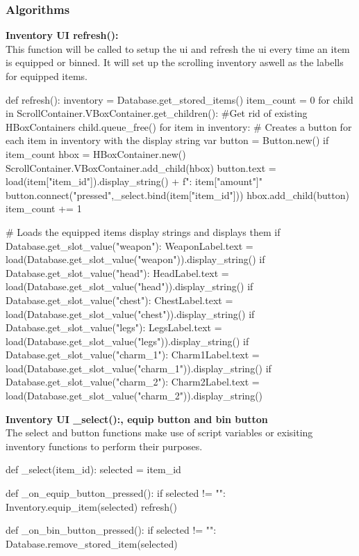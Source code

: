 \documentclass{article}
\begin{document}
        \subsubsection{Algorithms}
        \textbf{Inventory UI refresh():}\\
        This function will be called to setup the ui and refresh the ui every time an item is equipped or binned. It will set up the scrolling inventory aswell as the labells for equipped items.\\
        \begin{python}
def refresh():
   inventory = Database.get_stored_items()
   item_count = 0
   for child in ScrollContainer.VBoxContainer.get_children(): #Get rid of existing HBoxContainers
      child.queue_free()
   for item in inventory: # Creates a button for each item in inventory with the display string
      var button = Button.new()
      if item_count %
         hbox = HBoxContainer.new()
         ScrollContainer.VBoxContainer.add_child(hbox)
      button.text = load(item["item_id"]).display_string() + f"\nAmount: {item["amount"]}"
      button.connect("pressed",_select.bind(item["item_id"]))
      hbox.add_child(button)
      item_count += 1
                        
   # Loads the equipped items display strings and displays them
   if Database.get_slot_value("weapon"):
      WeaponLabel.text = load(Database.get_slot_value("weapon")).display_string()
   if Database.get_slot_value("head"):
      HeadLabel.text = load(Database.get_slot_value("head")).display_string()
   if Database.get_slot_value("chest"):
      ChestLabel.text = load(Database.get_slot_value("chest")).display_string()
   if Database.get_slot_value("legs"):
      LegsLabel.text = load(Database.get_slot_value("legs")).display_string()
   if Database.get_slot_value("charm_1"):
      Charm1Label.text = load(Database.get_slot_value("charm_1")).display_string()
   if Database.get_slot_value("charm_2"):
      Charm2Label.text = load(Database.get_slot_value("charm_2")).display_string()
        \end{python}
        \textbf{Inventory UI \_select():, equip button and bin button}\\
        The select and button functions make use of script variables or exisiting inventory functions to perform their purposes.\\
        \begin{python}
def _select(item_id):
   selected = item_id
        
def _on_equip_button_pressed():
   if selected != "":
      Inventory.equip_item(selected)
      refresh()
        
def _on_bin_button_pressed():
   if selected != "":
      Database.remove_stored_item(selected)
        \end{python}
\end{document}
